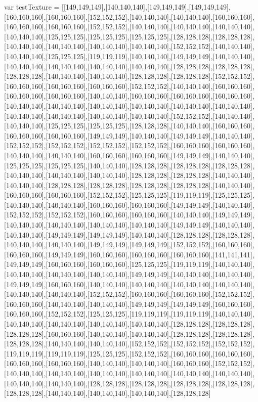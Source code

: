 var testTexture = [[149,149,149],[140,140,140],[149,149,149],[149,149,149],[160,160,160],[160,160,160],[152,152,152],[140,140,140],[140,140,140],[160,160,160],[160,160,160],[160,160,160],[152,152,152],[140,140,140],[140,140,140],[140,140,140],[140,140,140],[125,125,125],[125,125,125],[125,125,125],[128,128,128],[128,128,128],[140,140,140],[140,140,140],[140,140,140],[140,140,140],[152,152,152],[140,140,140],[140,140,140],[125,125,125],[119,119,119],[140,140,140],[149,149,149],[140,140,140],[140,140,140],[140,140,140],[140,140,140],[140,140,140],[128,128,128],[128,128,128],[128,128,128],[140,140,140],[140,140,140],[128,128,128],[128,128,128],[152,152,152],[160,160,160],[160,160,160],[160,160,160],[152,152,152],[140,140,140],[160,160,160],[160,160,160],[160,160,160],[140,140,140],[160,160,160],[160,160,160],[160,160,160],[140,140,140],[140,140,140],[140,140,140],[140,140,140],[140,140,140],[140,140,140],[140,140,140],[140,140,140],[140,140,140],[140,140,140],[152,152,152],[140,140,140],[140,140,140],[125,125,125],[125,125,125],[128,128,128],[140,140,140],[160,160,160],[160,160,160],[160,160,160],[149,149,149],[140,140,140],[149,149,149],[140,140,140],[152,152,152],[152,152,152],[152,152,152],[152,152,152],[160,160,160],[160,160,160],[140,140,140],[140,140,140],[160,160,160],[160,160,160],[149,149,149],[140,140,140],[125,125,125],[125,125,125],[140,140,140],[128,128,128],[128,128,128],[128,128,128],[140,140,140],[140,140,140],[140,140,140],[128,128,128],[128,128,128],[140,140,140],[140,140,140],[128,128,128],[128,128,128],[128,128,128],[128,128,128],[140,140,140],[160,160,160],[160,160,160],[152,152,152],[125,125,125],[119,119,119],[125,125,125],[140,140,140],[140,140,140],[160,160,160],[160,160,160],[149,149,149],[140,140,140],[152,152,152],[152,152,152],[160,160,160],[160,160,160],[140,140,140],[149,149,149],[140,140,140],[140,140,140],[140,140,140],[140,140,140],[149,149,149],[140,140,140],[140,140,140],[149,149,149],[149,149,149],[140,140,140],[128,128,128],[128,128,128],[140,140,140],[140,140,140],[149,149,149],[149,149,149],[152,152,152],[160,160,160],[160,160,160],[149,149,149],[160,160,160],[160,160,160],[160,160,160],[141,141,141],[149,149,149],[160,160,160],[160,160,160],[125,125,125],[119,119,119],[140,140,140],[140,140,140],[140,140,140],[140,140,140],[149,149,149],[140,140,140],[140,140,140],[149,149,149],[160,160,160],[140,140,140],[140,140,140],[140,140,140],[140,140,140],[140,140,140],[140,140,140],[152,152,152],[160,160,160],[160,160,160],[152,152,152],[160,160,160],[140,140,140],[140,140,140],[149,149,149],[149,149,149],[160,160,160],[160,160,160],[152,152,152],[125,125,125],[119,119,119],[119,119,119],[140,140,140],[140,140,140],[140,140,140],[140,140,140],[140,140,140],[128,128,128],[128,128,128],[128,128,128],[160,160,160],[140,140,140],[140,140,140],[128,128,128],[128,128,128],[128,128,128],[140,140,140],[140,140,140],[152,152,152],[152,152,152],[152,152,152],[119,119,119],[119,119,119],[125,125,125],[152,152,152],[160,160,160],[160,160,160],[160,160,160],[160,160,160],[140,140,140],[140,140,140],[160,160,160],[152,152,152],[140,140,140],[140,140,140],[140,140,140],[140,140,140],[140,140,140],[140,140,140],[140,140,140],[140,140,140],[128,128,128],[128,128,128],[128,128,128],[128,128,128],[128,128,128],[140,140,140],[140,140,140],[140,140,140],[128,128,128]